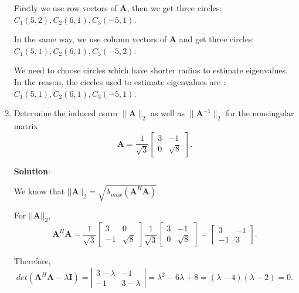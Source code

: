 \documentclass[12pt, a4paper, UTF8]{ctexart}
\begin{document}
\begin{enumerate}
		Firstly we use row vectors of $\bm{A}$, then we get three circles: $C_{1}(5,2),C_{2}(6,1),C_{3}(-5,1)$. 
		
		In the same way, we use column vectors of $\bm{A}$ and get three circles: $C_{1}(5,1),C_{2}(6,1),C_{3}(-5,2)$.

		We need to choose circles which have shorter radius to estimate eigenvalues. In the reason, the ciecles used to estimate eigenvalues are : $C_{1}(5,1),C_{2}(6,1),C_{3}(-5,1)$.

		\item
		Determine the induced norm $\|\bm{A}\|_{2}$ as well as $\|\bm{A}^{-1}\|_{2}$ for the nonsingular matrix
		$$
		\bm{A}=\frac{1}{\sqrt{3}}
			\begin{bmatrix}
			3 & -1\\
			0 & \sqrt{8}
			\end{bmatrix}.
		$$


		\textbf{Solution}:

		We know that $||\bm{A}||_2 = \sqrt{\lambda_{max} (\bm{A}^H \bm{A})}$

		For $||\bm{A}||_2$, 
		\begin{equation*}
			\bm{A}^H\bm{A}=\frac{1}{\sqrt{3}}
			\begin{bmatrix}
				3 & 0\\ 
				-1 & \sqrt{8} 
			\end{bmatrix} \frac{1}{\sqrt{3}}
			\begin{bmatrix} 
				3 & -1\\ 
				0&\sqrt{8} 
			\end{bmatrix}=
			\begin{bmatrix}
				3&-1\\ 
				-1&3 
			\end{bmatrix}.
		\end{equation*}

		Therefore,
		\begin{equation*}
			det(\bm{A}^H\bm{A}-\lambda\bm{I})= 
			\left|\begin{matrix}
				3-\lambda & -1 \\ 
				-1 & 3-\lambda 
			\end{matrix} \right|
			=\lambda ^2 -6 \lambda  +8=(\lambda -4)(\lambda -2)=0.
		\end{equation*}


\end{enumerate}
\end{document}
